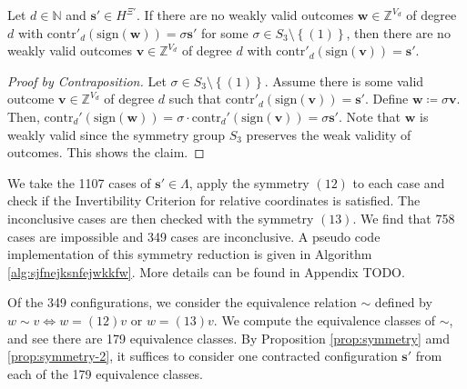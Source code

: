 \begin{proposition}
    Let \( d \in \mathbb{N} \) and \( \mathbf{s}' \in H^{\Xi'} \). If there are no weakly valid outcomes \( \mathbf{w} \in \mathbb{Z}^{V_d} \) of degree \( d \) with \( \mathrm{contr}'_{d}(\mathrm{sign}(\mathbf{w})) = \sigma \mathbf{s}' \) for some \( \sigma \in S_3 \setminus \left\{ (1) \right\} \), then there are no weakly valid outcomes \( \mathbf{v} \in \mathbb{Z}^{V_d} \) of degree \( d \) with \( \mathrm{contr}'_{d}(\mathrm{sign}(\mathbf{v})) = \mathbf{s}' \).
\end{proposition}

\begin{proof}[Proof by Contraposition]
    Let \( \sigma \in S_3 \setminus \left\{ (1) \right\} \).
    Assume there is some valid outcome \( \mathbf{v} \in \mathbb{Z}^{V_d} \) of degree \( d \) such that \( \mathrm{contr}'_d(\mathrm{sign}(\mathbf{v})) = \mathbf{s}' \). Define \( \mathbf{w} \coloneqq \sigma \mathbf{v} \). Then, \( \mathrm{contr}_d'(\mathrm{sign}( \mathbf{w})) =  \sigma \cdot \mathrm{contr}_d'(\mathrm{sign}(\mathbf{v}))  = \sigma \mathbf{s}'\). Note that \( \mathbf{w} \) is weakly valid since the symmetry group \( S_3 \) preserves the weak validity of outcomes. This shows the claim.
\end{proof}

We take the 1107 cases of \( \mathbf{s}' \in \Lambda \), apply the symmetry \( (12) \) to each case and check if the Invertibility Criterion for relative coordinates is satisfied. The inconclusive cases are then checked with the symmetry \( (13) \). We find that 758 cases are impossible and 349 cases are inconclusive. A pseudo code implementation of this symmetry reduction is given in Algorithm \ref{alg:sjfnejksnfejwkkfw}. More details can be found in Appendix TODO.

Of the 349 configurations, we consider the equivalence relation $\sim$ defined by $w \sim v \iff w = (12) v \text{ or } w = (13)v$. We compute the equivalence classes of $\sim$, and see there are 179 equivalence classes. By Proposition \ref{prop:symmetry} amd \ref{prop:symmetry-2}, it suffices to consider one contracted configuration \( \mathbf{s}' \) from each of the 179 equivalence classes. 

